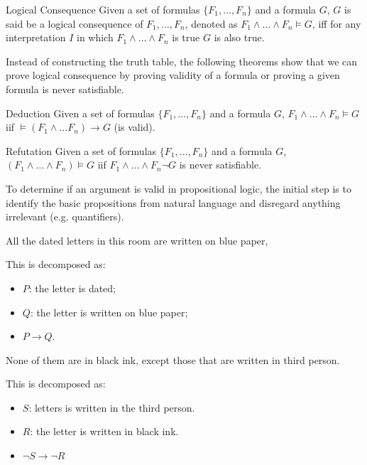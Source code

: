 \documentclass{article}
\begin{document}
\begin{Definition}{Logical Consequence}{}
    Given a set of formulas $\{F_1,\ldots,F_n\}$ and a formula $G$, $G$ is
    said be a logical consequence of $F_1,\ldots,F_n$, denoted as
    $F_1\land\ldots \land F_n\models G$, iff for any interpretation $I$ in
    which $F_1\land\ldots\land F_n$ is true $G$ is also true.
\end{Definition}
Instead of constructing the truth table, the following theorems show that we
can prove logical consequence by proving validity of a formula or proving a
given formula is never satisfiable.
\begin{Theorem}{Deduction}{}
    Given a set of formulas $\{F_1,\ldots,F_n\}$ and a formula $G$,
    $F_1\land\ldots \land F_n\models G$ iif $\models(F_1\land\ldots F_n)\to G$
    (is valid).
\end{Theorem}
\begin{Theorem}{Refutation}{}
    Given a set of formulas $\{F_1,\ldots,F_n\}$ and a formula $G$,
    $(F_1\land\ldots\land F_n)\models G$  iif $F_1\land\ldots\land F_n\neg G$
    is never satisfiable.
\end{Theorem}
\begin{example}
    To determine if an argument is valid in propositional logic, the initial
    step is to identify the basic propositions from natural language and
    disregard anything irrelevant (e.g. quantifiers).

    All the dated letters in this room are  written on blue paper,

    This is decomposed as:
    \begin{itemize}
        \item $P$: the letter is dated; 
        \item $Q$: the letter is written on blue paper;
        \item $P\to Q$.
    \end{itemize}
    None of them are in black ink, except those that are written in third
    person.

    This is decomposed as:
    \begin{itemize}
        \item $S$: letters is written in the third person. 
        \item $R$: the letter is written in black ink.
        \item $\neg S\to\neg R$
    \end{itemize}
\end{example}
\end{document}
